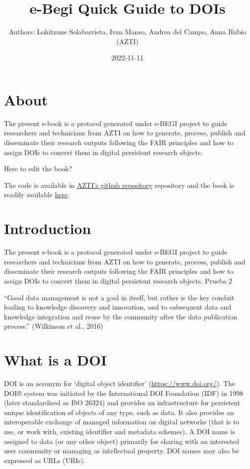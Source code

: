 \documentclass[
]{book}
\title{e-Begi Quick Guide to DOIs}
\author{Authors: Lohitzune Solabarrieta, Ivan Manso, Andrea del Campo, Anna Rubio (AZTI)}
\date{2022-11-11}
\begin{document}
\maketitle

{
\setcounter{tocdepth}{1}
\tableofcontents
}
\hypertarget{about}{%
\chapter*{About}\label{about}}

The present e-book is a protocol generated under e-BEGI project to guide researchers and technicians from AZTI on how to generate, process, publish and disseminate their research outputs following the FAIR principles and how to assign DOIs to convert them in digital persistent research objects.

Here to edit the book?

The code is available in \href{https://github.com/Fundacion-AZTI/ebegi_quickguide2DOIs}{AZTI's github repository} repository and the book is readily available \href{https://fundacion-azti.github.io/ebegi_quickguide2DOIs/}{here}.

\hypertarget{introduction}{%
\chapter{Introduction}\label{introduction}}

The present e-book is a protocol generated under e-BEGI project to guide researchers and technicians from AZTI on how to generate, process, publish and disseminate their research outputs following the FAIR principles and how to assign DOIs to convert them in digital persistent research objects. Prueba 2

``Good data management is not a goal in itself, but rather is the key conduit leading to knowledge discovery and innovation, and to subsequent data and knowledge integration and reuse by the community after the data publication process.'' (Wilkinson et al., 2016)

\hypertarget{what-is-a-doi}{%
\chapter{What is a DOI}\label{what-is-a-doi}}

DOI is an acronym for `digital object identifier' (\url{https://www.doi.org/}). The DOI® system was initiated by the International DOI Foundation (IDF) in 1998 (later standardised as ISO 26324) and provides an infrastructure for persistent unique identification of objects of any type, such as data. It also provides an interoperable exchange of managed information on digital networks (that is to use, or work with, existing identifier and metadata schemes). A DOI name is assigned to data (or any other object) primarily for sharing with an interested user community or managing as intellectual property. DOI names may also be expressed as URLs (URIs).
\end{document}
